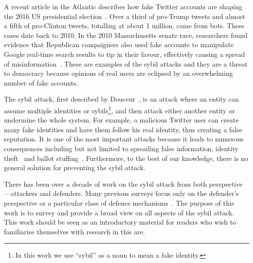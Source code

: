 
\begin{comment}
Electronic commerce and online social networks allow us to orchestrate many
aspects of our lives in the comfort of our homes, behind the monitors of our
devices. With such services, online identity is often required. For example in
Twitter\footnote{Twitter (\texttt{https://twitter.com/}) is a social network website
  where users can send and read short messages---called ``tweets'', users can
  also ``follow'' each other.}, users must create accounts to tweet a friend,
who must also have an account. In this scenario, users can choose to remain
pseudonymous if they are careful, where their real-life identity is uncorrelated
with their online identity. While that is useful for protecting the users'
privacy, it also opens an alleyway for attackers.
\end{comment}

A recent article in the Atlantic describes how fake Twitter accounts are shaping
the 2016 US presidential election~\cite{atlantictwitterbots}. Over a third of
pro-Trump tweets and almost a fifth of pro-Clinton tweets, totalling at about 1
million, came from bots. These cases date back to 2010. In the 2010
Massachusetts senate race, researchers found evidence that Republican
campaigners also used fake accounts to manipulate Google real-time search
results to tip in their favour, effectively causing a spread of
misinformation~\cite{mustafaraj2010obscurity}. These are examples of the sybil
attacks and they are a threat to democracy because opinions of real users are
eclipsed by an overwhelming number of fake accounts.

The sybil attack, first described by Douceur~\cite{douceur2002sybil}, is an
attack where an entity can assume multiple identities or sybils\footnote{In this
  work we use ``sybil'' as a noun to mean a fake identity.}, and then attack
either another entity or undermine the whole system. For example, a malicious
Twitter user can create many fake identities and have them follow his real
identity, thus creating a false reputation. It is one of the most important
attacks because it leads to numerous consequences including but not limited to
spreading false information, identity theft~\cite{bilge2009all} and ballot
stuffing~\cite{bhattacharjee2005avoiding}. Furthermore, to the best of our
knowledge, there is no general solution for preventing the sybil attack.

There has been over a decade of work on the sybil attack from both
perspective---attackers and defenders. Many previous surveys focus only on the
defender's perspective or a particular class of defence
mechanisms~\cite{marti2006taxonomy, mohaisen2013sybil, rakesh2014survey,
  koll2014state}. The purpose of this work is to survey and provide a broad view
on all aspects of the sybil attack. This work should be seen as an introductory
material for readers who wish to familiarise themselves with research in this
are.

